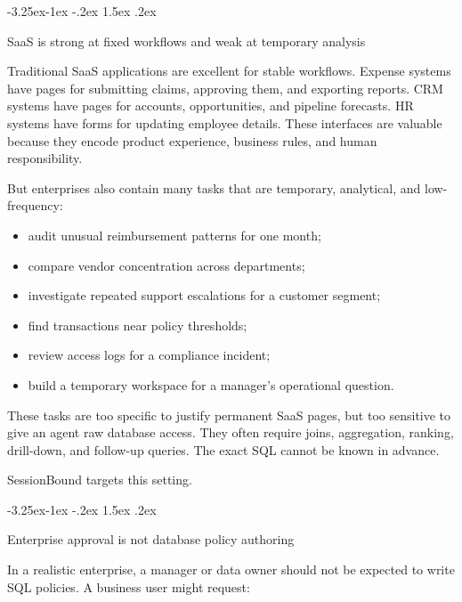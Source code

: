\documentclass[10pt,twocolumn]{article}
\makeatletter
\providecommand{\tightlist}{%
  \setlength{\itemsep}{0pt}\setlength{\parskip}{0pt}}
\renewcommand\subsection{\@startsection{subsection}{2}{\z@}%
  {-3.25ex\@plus -1ex \@minus -.2ex}%
  {1.5ex \@plus .2ex}%
  {\normalfont\large\bfseries\raggedright}}
\makeatother
\begin{document}
\hypertarget{saas-is-strong-at-fixed-workflows-and-weak-at-temporary-analysis}{%
\subsection{SaaS is strong at fixed workflows and weak at
temporary
analysis}\label{saas-is-strong-at-fixed-workflows-and-weak-at-temporary-analysis}}

Traditional SaaS applications are excellent for stable workflows.
Expense systems have pages for submitting claims, approving them, and
exporting reports. CRM systems have pages for accounts, opportunities,
and pipeline forecasts. HR systems have forms for updating employee
details. These interfaces are valuable because they encode product
experience, business rules, and human responsibility.

But enterprises also contain many tasks that are temporary, analytical,
and low-frequency:

\begin{itemize}
\tightlist
\item
  audit unusual reimbursement patterns for one month;
\item
  compare vendor concentration across departments;
\item
  investigate repeated support escalations for a customer segment;
\item
  find transactions near policy thresholds;
\item
  review access logs for a compliance incident;
\item
  build a temporary workspace for a manager's operational question.
\end{itemize}

These tasks are too specific to justify permanent SaaS pages, but too
sensitive to give an agent raw database access. They often require
joins, aggregation, ranking, drill-down, and follow-up queries. The
exact SQL cannot be known in advance.

SessionBound targets this setting.

\hypertarget{enterprise-approval-is-not-database-policy-authoring}{%
\subsection{Enterprise approval is not database policy
authoring}\label{enterprise-approval-is-not-database-policy-authoring}}

In a realistic enterprise, a manager or data owner should not be
expected to write SQL policies. A business user might request:
\end{document}
